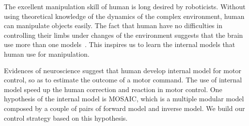 %



The excellent manipulation skill of human is long desired by roboticists. Without using theoretical knowledge of the dynamics of the complex environment, human can manipulate objects easily. The fact that human have no difficulties in controlling their limbs under changes of the environment suggests that the brain use more than one models~\cite{haruno2001mosaic}. This inspires us to learn the internal models that human use for manipulation.

Evidences of neuroscience suggest that human develop internal model for motor control, so as to estimate the outcome of a motor command. The use of internal model speed up the human correction and reaction in motor control. One hypothesis of the internal model is MOSAIC, which is a multiple modular model composed by a couple of pairs of forward model and inverse model. We build our control strategy based on this hypothesis.

